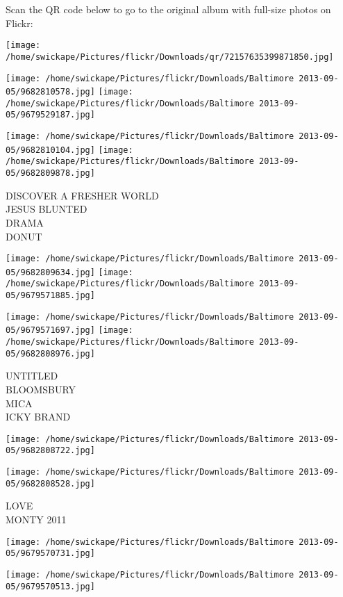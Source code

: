\documentclass[10pt,letterpaper]{article}
\begin{document}
Scan the QR code below to go to the original album with full-size photos on Flickr:

\texttt{[image: /home/swickape/Pictures/flickr/Downloads/qr/72157635399871850.jpg]}
\pagebreak

\texttt{[image: /home/swickape/Pictures/flickr/Downloads/Baltimore 2013-09-05/9682810578.jpg]}
\texttt{[image: /home/swickape/Pictures/flickr/Downloads/Baltimore 2013-09-05/9679529187.jpg]}

\texttt{[image: /home/swickape/Pictures/flickr/Downloads/Baltimore 2013-09-05/9682810104.jpg]}
\texttt{[image: /home/swickape/Pictures/flickr/Downloads/Baltimore 2013-09-05/9682809878.jpg]}

DISCOVER A FRESHER WORLD\\
JESUS BLUNTED\\
DRAMA\\
DONUT
\pagebreak

\texttt{[image: /home/swickape/Pictures/flickr/Downloads/Baltimore 2013-09-05/9682809634.jpg]}
\texttt{[image: /home/swickape/Pictures/flickr/Downloads/Baltimore 2013-09-05/9679571885.jpg]}

\texttt{[image: /home/swickape/Pictures/flickr/Downloads/Baltimore 2013-09-05/9679571697.jpg]}
\texttt{[image: /home/swickape/Pictures/flickr/Downloads/Baltimore 2013-09-05/9682808976.jpg]}

UNTITLED\\
BLOOMSBURY\\
MICA\\
ICKY BRAND
\pagebreak

\texttt{[image: /home/swickape/Pictures/flickr/Downloads/Baltimore 2013-09-05/9682808722.jpg]}

\vspace{0.25in}
\texttt{[image: /home/swickape/Pictures/flickr/Downloads/Baltimore 2013-09-05/9682808528.jpg]}

LOVE\\
MONTY 2011
\pagebreak

\texttt{[image: /home/swickape/Pictures/flickr/Downloads/Baltimore 2013-09-05/9679570731.jpg]}

\vspace{0.25in}
\texttt{[image: /home/swickape/Pictures/flickr/Downloads/Baltimore 2013-09-05/9679570513.jpg]}
\end{document}
